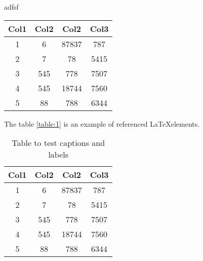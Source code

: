 {adfsf \\
%
%
\newline
%
\begin{table}[h!]
\centering
 \begin{tabular}{||c c c c||} 
 \hline
 Col1 & Col2 & Col2 & Col3 \\ [0.5ex] 
 \hline\hline
 1 & 6 & 87837 & 787 \\ 
 2 & 7 & 78 & 5415 \\
 3 & 545 & 778 & 7507 \\
 4 & 545 & 18744 & 7560 \\
 5 & 88 & 788 & 6344 \\ [1ex] 
 \hline
 \end{tabular}
\end{table}
%
\newline
The table \ref{table:1} is an example of referenced \LaTeX elements.
\begin{table}[h!]
\centering
\begin{tabular}{||c c c c||} 
 \hline
 Col1 & Col2 & Col2 & Col3 \\ [0.5ex] 
 \hline\hline
 \rowcolor{gray} 1 & 6 & 87837 & 787 \\ 
 2 & 7 & 78 & \cellcolor[HTML]{AA0044} 5415 \\
 \rowcolor{gray} 3 & 545 & 778 & 7507 \\
 4 & 545 & 18744 & 7560 \\
 \rowcolor{gray} 5 & 88 & 788 & 6344 \\ [1ex] 
 \hline
\end{tabular}
\caption{Table to test captions and labels}
\label{table:2}
\end{table}




}
